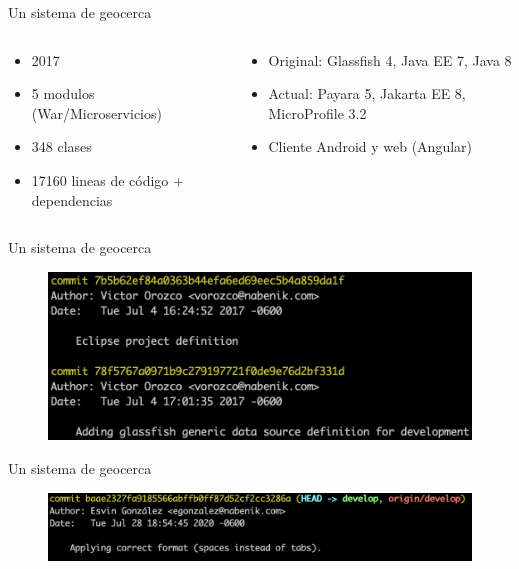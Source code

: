 \documentclass[aspectratio=169]{beamer}
\begin{document}
\begin{frame}[fragile]{Un sistema de geocerca}
\begin{columns}[T] %

    \begin{column}[T]{5cm} %
       \begin{itemize}
       \item 2017
               \item 5 modulos (War/Microservicios)
               \item 348 clases
               \item 17160 lineas de código + dependencias
       \end{itemize}
    \end{column}
    \begin{column}[T]{6cm} %
        \begin{itemize}
           \item Original: Glassfish 4, Java EE 7, Java 8
           \item Actual: Payara 5, Jakarta EE 8, MicroProfile 3.2
           \item Cliente Android y web (Angular)
       \end{itemize}
    \end{column}
\end{columns}
\end{frame}

\begin{frame}[fragile]{Un sistema de geocerca}

    \begin{figure}
        \centering
        \includegraphics[width=\linewidth]{Images/fcommit}
    \end{figure}
\end{frame}

\begin{frame}[fragile]{Un sistema de geocerca}

    \begin{figure}
        \centering
        \includegraphics[width=\linewidth]{Images/lcommit}
    \end{figure}
\end{frame}
\end{document}
